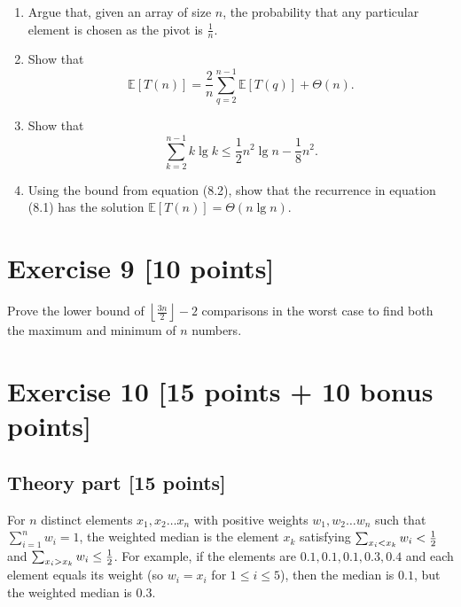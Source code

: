 \documentclass[11pt]{article}
\theoremstyle{theorem}
\theoremstyle{lemma}
\theoremstyle{corollary}
\theoremstyle{definition}
\begin{document}
\begin{enumerate}
    \item Argue that, given an array of size $n$, the probability that any particular element is chosen as the pivot is $\frac{1}{n}$.  
    
   
    \item Show that 
    \[
    \mathbb{E}[T(n)] = \frac{2}{n} \sum_{q=2}^{n-1} \mathbb{E}[T(q)] + \Theta(n).   \tag{8.1}
    \]
    
    \item Show that
    \[
    \sum_{k=2}^{n-1} k \lg k \leq \frac{1}{2} n^2 \lg n - \frac{1}{8} n^2. \tag{8.2}
    \]
 
    \item Using the bound from equation (8.2), show that the recurrence in equation (8.1) has the solution $\mathbb{E}[T(n)] = \Theta(n \lg n)$.  
\end{enumerate}

  \section*{Exercise 9 [10 points]} 

Prove the lower bound of \( \left\lfloor \frac{3n}{2} \right\rfloor - 2 \) comparisons in the worst case to find both the maximum and minimum of \( n \) numbers.

  \section*{Exercise 10 [15 points + 10 bonus points]} 

\subsection*{Theory part [15 points]}

For $n$ distinct elements $x_1,x_2\dots x_n$ with positive weights $w_1,w_2\dots w_n$ such that $\sum_{i=1}^n w_i=1$, the weighted median is the element $x_k$ satisfying $\sum_{x_i<x_k}w_i<{1\over 2}$ and $\sum_{x_i>x_k}w_i\leq {1\over 2}$. For example, if the elements are $0.1,0.1,0.1,0.3,0.4$ and each element equals its weight (so $w_i=x_i$ for $1\leq i\leq 5$), then the median is $0.1$, but the weighted median is $0.3$.
\end{document}
